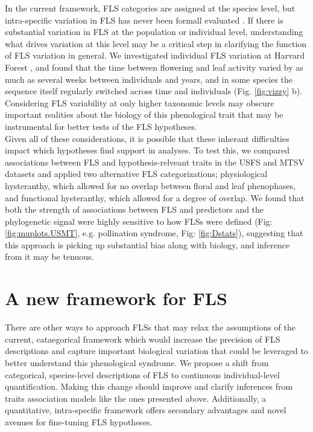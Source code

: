 \documentclass{article}
\begin{document}
In the current framework, FLS categories are assigned at the species level, but intra-specific variation in FLS has never been formall evaluated \citep{Gougherty2018}. If there is substantial variation in FLS at the population or individual level, understanding what drives variation at this level may be a critical step in clarifying the function of FLS variation in general.  We investigated individual FLS variation at Harvard Forest \citep{OKeefe2015}, and found that the time between flowering and leaf activity varied by as much as several weeks between individuals and years, and in some species the sequence itself regularly switched across time and individuals  (Fig. \ref{fig:vizzy} b). %
Considering FLS variability at only higher taxonomic levels may obscure important realities about the biology of this phenological trait that may be instrumental for better tests of the FLS hypotheses.\\

\noindent Given all of these considerations, it is possible that these inherant difficulties impact which hypotheses find support in analyses. To test this, we compared associations between FLS and hypothesis-relveant traits in the USFS and MTSV datasets and applied two alternative FLS categorizations; physiological hysteranthy, which allowed for no overlap between floral and leaf phenophases, and functional hysteranthy, which allowed for a degree of overlap. We found that both the strength of associations between FLS and predictors and the phylogenetic signal were highly sensitive to how FLSs were defined (Fig: \ref{fig:muplots.USMT}, e.g. pollination syndrome, Fig: \ref{fig:Dstats}), suggesting that this approach is picking up substantial bias along with biology, and inference from it may be tenuous. \\

\section*{A new framework for FLS}

\noindent There are other ways to approach FLSs that may relax the assumptions of the current, cataegorical framework which would increase the precision of FLS descriptions and capture important biological variation that could be leveraged to better understand this phenological syndrome. We propose a shift from categorical, species-level descriptions of FLS to continuous individual-level quantification.  Making this change should improve and clarify inferences from traits association models like the ones presented above. Additionally, a quantitative, intra-specific framework offers secondary advantages and novel avenues for fine-tuning FLS hypotheses.\\
\end{document}
